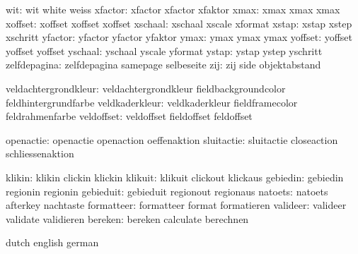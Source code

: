                  wit:  wit                  white                weiss
             xfactor:  xfactor              xfactor              xfaktor
                xmax:  xmax                 xmax                 xmax
             xoffset:  xoffset              xoffset              xoffset
             xschaal:  xschaal              xscale               xformat
               xstap:  xstap                xstep                xschritt
             yfactor:  yfactor              yfactor              yfaktor
                ymax:  ymax                 ymax                 ymax
             yoffset:  yoffset              yoffset              yoffset
             yschaal:  yschaal              yscale               yformat
               ystap:  ystap                ystep                yschritt
        zelfdepagina:  zelfdepagina         samepage             selbeseite
                 zij:  zij                  side                 objektabstand

veldachtergrondkleur:  veldachtergrondkleur fieldbackgroundcolor feldhintergrundfarbe
      veldkaderkleur:  veldkaderkleur       fieldframecolor      feldrahmenfarbe
          veldoffset:  veldoffset           fieldoffset          feldoffset

           openactie:  openactie            openaction           oeffenaktion 
          sluitactie:  sluitactie           closeaction          schliessenaktion

              klikin:  klikin               clickin              klickin
             klikuit:  klikuit              clickout             klickaus
            gebiedin:  gebiedin             regionin             regionin
           gebieduit:  gebieduit            regionout            regionaus
             natoets:  natoets              afterkey             nachtaste
          formatteer:  formatteer           format               formatieren
            valideer:  valideer             validate             validieren
             bereken:  bereken              calculate            berechnen

\stopconstants




\startvariables       dutch                english             german

